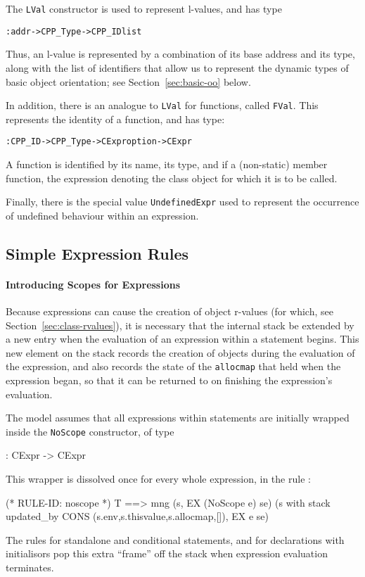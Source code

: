 \documentclass[11pt]{article}
\begin{document}
The \texttt{LVal} constructor is used to represent l-values, and has
type
\begin{alltt}
   : addr -> CPP_Type -> CPP_ID list
\end{alltt}
Thus, an l-value is represented by a combination of its base address
and its type, along with the list of identifiers that allow us to
represent the dynamic types of basic object orientation; see
Section~\ref{sec:basic-oo} below.

In addition, there is an analogue to \texttt{LVal} for functions,
called \texttt{FVal}.  This represents the identity of a function, and
has type:
\begin{alltt}
   : CPP_ID -> CPP_Type -> CExpr option -> CExpr
\end{alltt}
A function is identified by its name, its type, and if a (non-static)
member function, the expression denoting the class object for which it
is to be called.

Finally, there is the special value \texttt{UndefinedExpr} used to
represent the occurrence of undefined behaviour within an expression.

\subsection{Simple Expression Rules}
\label{sec:simple-expr-rules}

\paragraph{Introducing Scopes for Expressions}
Because \cpp{} expressions can cause the creation of object r-values
(for which, see Section~\ref{sec:class-rvalues}), it is necessary that
the internal stack be extended by a new entry when the evaluation of
an expression within a statement begins.  This new element on the
stack records the creation of objects during the evaluation of the
expression, and also records the state of the \texttt{allocmap} that
held when the expression began, so that it can be returned to on
finishing the expression's evaluation.

The model assumes that all expressions within statements are initially
wrapped inside the \texttt{NoScope} constructor, of type
\begin{stdrule}
   : CExpr -> CExpr
\end{stdrule}
This wrapper is dissolved once for every whole expression, in the rule
:
\begin{stdrule}
(* RULE-ID: noscope *)
     T
   ==>
     mng (s, EX (NoScope e) se)
         (s with stack updated_by
                   CONS (s.env,s.thisvalue,s.allocmap,[]),
          EX e se)
\end{stdrule}
The rules for standalone and conditional statements, and for
declarations with initialisors pop this extra ``frame'' off the stack
when expression evaluation terminates.
\end{document}
